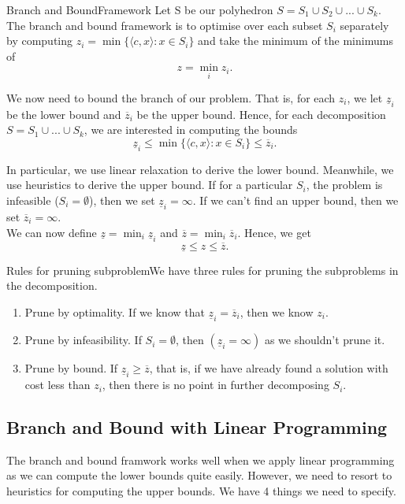 \documentclass[twoside]{article}
\begin{document}
\begin{definition_exam}{Branch and BoundFramework}{} Let S be our polyhedron $S = S_1 \cup S_2 \cup ... \cup S_k.$ The branch and bound framework is to optimise over each subset $S_i$ separately by computing $z_i = \min\{\langle c,x \rangle: x \in S_i\}$ and take the minimum of the minimums of 
$$
z = \min_{i}z_i.
$$
\end{definition_exam}


We now need to bound the branch of our problem. That is, for each $z_i$, we let $\underline{z}_i$ be the lower bound and $\overline{z}_i$ be the upper bound. Hence, for each decomposition $S = S_1 \cup ... \cup S_k$, we are interested in computing the bounds 
$$
\underline{z}_i \leq \min \{\langle c,x \rangle: x \in S_i\} \leq \overline{z}_i.
$$

In particular, we use linear relaxation to derive the lower bound. Meanwhile, we use heuristics to derive the upper bound.
If for a particular $S_i$, the problem is infeasible ($S_i = \emptyset$), then we set $\underline{z}_i = \infty.$ If we can't find an upper bound, then we set $\overline{z}_i = \infty.$\\
We can now define $\underline{z} = \min_{i}\underline{z}_i$ and $\overline{z} = \min_{i}\overline{z}_i$. Hence, we get 
$$
\underline{z} \leq z \leq \overline{z}.
$$

\begin{theorem_exam}{Rules for pruning subproblem}{}We have three rules for pruning the subproblems in the decomposition.
\begin{enumerate}
\item Prune by optimality. If we know that $\underline{z}_i = \overline{z}_i$, then we know $z_i.$
\item Prune by infeasibility. If $S_i = \emptyset$, then $(\underline{z}_i = \infty)$ as we shouldn't prune it.
\item Prune by bound. If $\underline{z}_i \geq \overline{z}$, that is, if we have already found a solution with cost less than $z_i$, then there is no point in further decomposing $S_i.$
\end{enumerate}
\end{theorem_exam}

\subsection{Branch and Bound with Linear Programming}
The branch and bound framwork works well when we apply linear programming as we can compute the lower bounds quite easily. However, we need to resort to heuristics for computing the upper bounds. We have 4 things we need to specify.
\end{document}
